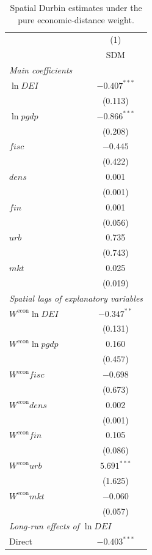 \documentclass[economies,article,submit,moreauthors]{Definitions/mdpi}
\begin{document}
\begin{table}[H]
\centering
\caption{Spatial Durbin estimates under the pure economic-distance weight.}
\label{tab:spatial_econ}
\scriptsize
\renewcommand{\arraystretch}{0.92}
\setlength{\tabcolsep}{4pt}
\begin{threeparttable}
\begin{tabular*}{0.62\textwidth}{@{\extracolsep{\fill}}lc}
\toprule
 & (1)\\
 & SDM\\
\midrule
\multicolumn{2}{l}{\textit{Main coefficients}}\\
$\ln DEI$ & $-0.407^{***}$\\
 & (0.113)\\
$\ln pgdp$ & $-0.866^{***}$\\
 & (0.208)\\
$fisc$ & $-0.445$\\
 & (0.422)\\
$dens$ & 0.001\\
 & (0.001)\\
$fin$ & 0.001\\
 & (0.056)\\
$urb$ & 0.735\\
 & (0.743)\\
$mkt$ & 0.025\\
 & (0.019)\\
\midrule
\multicolumn{2}{l}{\textit{Spatial lags of explanatory variables}}\\
$W^{\mathrm{econ}}\ln DEI$ & $-0.347^{**}$\\
 & (0.131)\\
$W^{\mathrm{econ}}\ln pgdp$ & 0.160\\
 & (0.457)\\
$W^{\mathrm{econ}}fisc$ & $-0.698$\\
 & (0.673)\\
$W^{\mathrm{econ}}dens$ & 0.002\\
 & (0.001)\\
$W^{\mathrm{econ}}fin$ & 0.105\\
 & (0.086)\\
$W^{\mathrm{econ}}urb$ & $5.691^{***}$\\
 & (1.625)\\
$W^{\mathrm{econ}}mkt$ & $-0.060$\\
 & (0.057)\\
\midrule
\multicolumn{2}{l}{\textit{Long-run effects of $\ln DEI$}}\\
Direct & $-0.403^{***}$\\

\end{tabular*}
\end{threeparttable}
\end{table}
\end{document}
